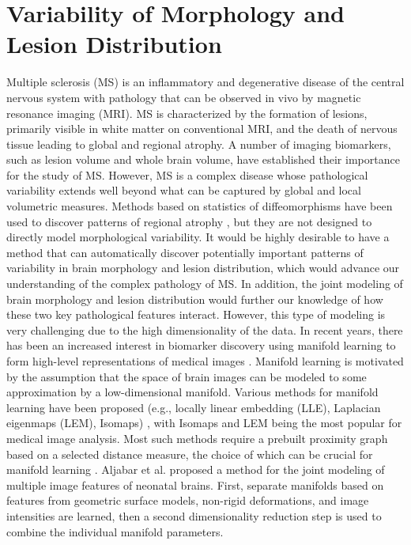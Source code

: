 \section{Variability of Morphology and Lesion Distribution}

Multiple sclerosis (MS) is an inflammatory and degenerative disease of the
central nervous system with pathology that can be observed in vivo by magnetic
resonance imaging (MRI). MS is characterized by the formation of lesions,
primarily visible in white matter on conventional MRI, and the death of nervous
tissue leading to global and regional atrophy. A number of imaging biomarkers,
such as lesion volume and whole brain volume, have established their importance
for the study of MS. However, MS is a complex disease whose pathological
variability extends well beyond what can be captured by global and local
volumetric measures. Methods based on statistics of diffeomorphisms have been
used to discover patterns of regional atrophy \cite{Ceccarelli2012}, but they
are not designed to directly model morphological variability. It would be highly
desirable to have a method that can automatically discover potentially important
patterns of variability in brain morphology and lesion distribution, which would
advance our understanding of the complex pathology of MS. In addition, the joint
modeling of brain morphology and lesion distribution would further our knowledge
of how these two key pathological features interact. However, this type of
modeling is very challenging due to the high dimensionality of the data. In
recent years, there has been an increased interest in biomarker discovery using
manifold learning to form high-level representations of medical images
\cite{Wolz2010b,AljabarRueckert2011,Wolz2012}. Manifold learning is motivated by
the assumption that the space of brain images can be modeled to some
approximation by a low-dimensional manifold. Various methods for manifold
learning have been proposed (e.g., locally linear embedding (LLE), Laplacian
eigenmaps (LEM), Isomaps) \cite{Cayton2005}, with Isomaps and LEM being the most
popular for medical image analysis. Most such methods require a prebuilt
proximity graph based on a selected distance measure, the choice of which can be
crucial for manifold learning \cite{Gerber2010}. Aljabar et al. proposed a
method \cite{AljabarRueckert2011} for the joint modeling of multiple image
features of neonatal brains. First, separate manifolds based on features from
geometric surface models, non-rigid deformations, and image intensities are
learned, then a second dimensionality reduction step is used to combine the
individual manifold parameters.

